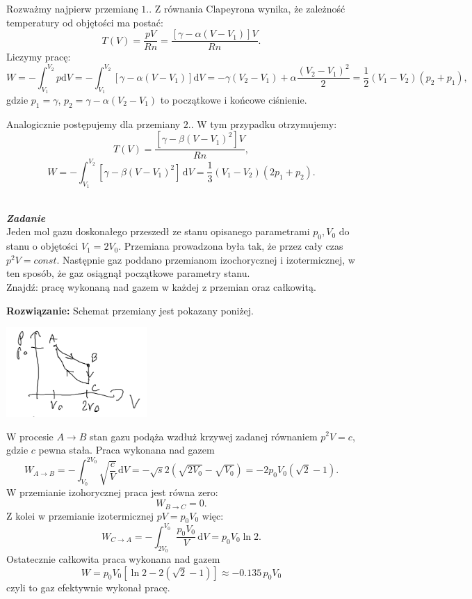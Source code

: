 \documentclass[11pt,a4paper]{article}
\newcounter{zadanie}\newcommand{\zadanie}[1][]{\addtocounter{zadanie}{1} ~\\  {\bf \emph{Zadanie \arabic{zadanie} #1 }} \\}
\renewcommand{\t}[1]{\textrm{#1}}
\begin{document}
Rozważmy najpierw przemianę $1.$. Z równania Clapeyrona wynika, że zależność temperatury od objętości ma postać:
$$
T(V) = \frac{p V}{R n} = \frac{[\gamma - \alpha(V-V_1)]V}{Rn }.
$$
Liczymy pracę:
$$
W = -\int_{V_1}^{V_2} p \t{d} V = -\int_{V_1}^{V_2} [\gamma - \alpha(V-V_1)] \t{d} V =  - \gamma(V_2 - V_1) + \alpha \frac{(V_2 - V_1)^2}{2} =
\frac{1}{2}(V_1-V_2)(p_2 +p_1),
$$
gdzie $p_1 =\gamma$, $p_2 = \gamma - \alpha(V_2-V_1)$ to początkowe i końcowe ciśnienie.

Analogicznie postępujemy dla przemiany $2.$. W tym przypadku otrzymujemy:
$$
T(V) = \frac{[\gamma - \beta(V-V_1)^2]V}{Rn },
$$
$$
W  = -\int_{V_1}^{V_2} [\gamma - \beta(V-V_1)^2]\, \t{d} V = \frac{1}{3}(V_1-V_2)(2 p_1+p_2).
$$


\zadanie
Jeden mol gazu doskonałego przeszedł ze stanu opisanego parametrami
$p_0, V_0$ do stanu o objętości $V_1 = 2 V_0$.
Przemiana prowadzona była tak, że przez cały czas $p^2 V = const$.
Następnie gaz poddano przemianom izochorycznej i izotermicznej, w ten sposób, że gaz osiągnął
początkowe parametry stanu. \\
Znajdź: pracę wykonaną nad gazem w każdej z przemian oraz całkowitą.


\vskip 10pt
\textbf{Rozwiązanie:}
Schemat przemiany jest pokazany poniżej.
\begin{center}
\includegraphics[width=0.4\textwidth]{zad4.PNG}
\end{center}

W procesie $A\rightarrow B$ stan gazu podąża wzdłuż krzywej zadanej równaniem $p^2 V = c$, gdzie $c$ pewna stała.
Praca wykonana nad gazem
$$
W_{A\rightarrow B} = -\int_{V_0}^{2 V_0} \sqrt{\frac{c}{V}}\,\t{d}V = -\sqrt{s} 2\left( \sqrt{2 V_0} - \sqrt{V_0}\right) = -2 p_0 V_0(\sqrt{2}-1).
$$
W przemianie izohorycznej praca jest równa zero:
$$
W_{B \rightarrow C} = 0.
$$
Z kolei w przemianie izotermicznej $p V = p_0 V_0$ więc:
$$
W_{C\rightarrow A} = - \int_{2V_0}^{V_0} \frac{p_0 V_0}{V}\, \t{d} V  = p_0 V_0 \ln 2.
$$
Ostatecznie całkowita praca wykonana nad gazem
 $$W = p_0 V_0 [\ln 2 -2(\sqrt{2}-1)] \approx -0.135 \,p_0V_0$$
 czyli to gaz efektywnie wykonał pracę.
\end{document}
